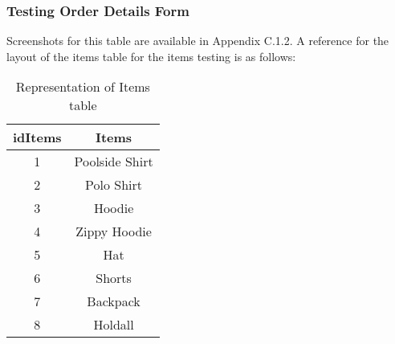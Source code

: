 \documentclass[
11pt, %
a4paper, %
oneside, %
headinclude,footinclude, %
BCOR5mm, %
]{scrartcl}
\begin{document}
	\subsubsection{Testing Order Details Form}
	Screenshots for this table are available in Appendix C.1.2. A reference for the layout of the items table for the items testing is as follows: 
	\begin{table}[H]
		\centering
		\caption{Representation of Items table}
		\begin{tabular}[c]{|c|c|}
			\hline
			idItems & Items \\
			\hline
			1 & Poolside Shirt \\
			2 & Polo Shirt \\
			3 & Hoodie \\
			4 & Zippy Hoodie \\
			5 & Hat \\
			6 & Shorts \\
			7 & Backpack \\
			8 & Holdall \\
			\hline
		\end{tabular}
	\end{table}
\end{document}
